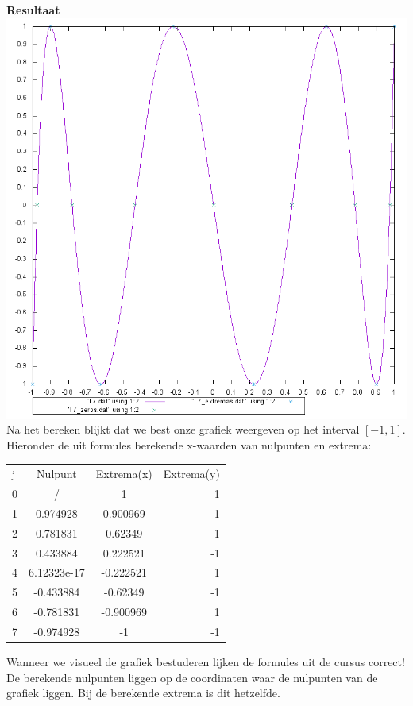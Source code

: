 \documentclass{article}
\begin{document}
\begin{flushleft}
\textbf{Resultaat}
\includegraphics[scale=0.6]{T7}
\newline
Na het bereken blijkt dat we best onze grafiek weergeven op het interval $[-1, 1]$. Hieronder de uit formules berekende x-waarden van nulpunten en extrema:
\newline

\begin{tabular}{ l c c r}
  j & Nulpunt & Extrema(x) & Extrema(y) \\
  0 & / & 1 & 1 \\
  1 & 0.974928 &0.900969 & -1  \\
  2 & 0.781831 & 0.62349 & 1 \\
  3 & 0.433884 & 0.222521 & -1 \\
  4 & 6.12323e-17 & -0.222521 & 1   \\
  5 & -0.433884 & -0.62349 & -1  \\
  6 & -0.781831 & -0.900969 &  1 \\
  7 & -0.974928 & -1 & -1  \\  
\end{tabular}
\newline
\newline

Wanneer we visueel de grafiek bestuderen lijken de formules uit de cursus correct! De berekende nulpunten liggen op de coordinaten waar de nulpunten van de grafiek liggen. Bij de berekende extrema is dit hetzelfde.


\end{flushleft}
\end{document}
